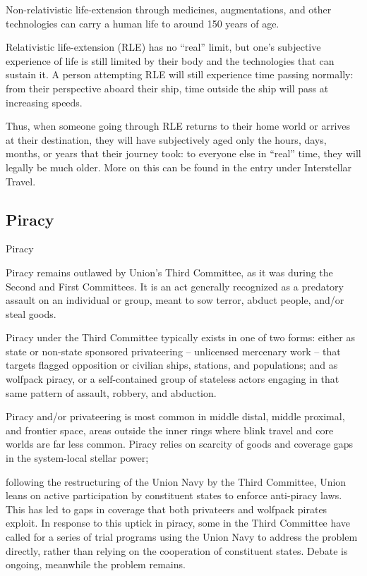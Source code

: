 Non-relativistic life-extension through medicines, augmentations, and other technologies can  
carry a human life to around 150 years of age.
 

Relativistic life-extension (RLE) has no “real” limit, but one’s subjective experience of life is still  
limited by their body and the technologies that can sustain it. A person attempting RLE will still  
experience time passing normally: from their perspective aboard their ship, time outside the ship  
will pass at increasing speeds. 
 

                                                                                                              


Thus, when someone going through RLE returns to their home world or arrives at their  
destination, they will have subjectively aged only the hours, days, months, or years that their  
journey took: to everyone else in “real” time, they will legally be much older. More on this can be  
found in the entry under Interstellar Travel. 
 
\subsection{Piracy}
Piracy   

Piracy remains outlawed by Union’s Third Committee, as it was during the Second and First  
Committees. It is an act generally recognized as a predatory assault on an individual or group,  
meant to sow terror, abduct people, and/or steal goods. 
 

Piracy under the Third Committee typically exists in one of two forms: either as state or non-state  
sponsored privateering -- unlicensed mercenary work -- that targets flagged opposition or  
civilian ships, stations, and populations; and as wolfpack piracy, or a self-contained group of  
stateless actors engaging in that same pattern of assault, robbery, and abduction. 
 

Piracy and/or privateering is most common in middle distal, middle proximal, and frontier space,  
areas outside the inner rings where blink travel and core worlds are far less common. Piracy  
relies on scarcity of goods and coverage gaps in the system-local stellar power;
 
following the restructuring of the Union Navy by the Third Committee, Union leans on active  
participation by constituent states to enforce anti-piracy laws. This has led to gaps in coverage  
that both privateers and wolfpack pirates exploit. In response to this uptick in piracy, some in the  
Third Committee have called for a series of trial programs using the Union Navy to address the  
problem directly, rather than relying on the cooperation of constituent states. Debate is ongoing,  
meanwhile the problem remains. 
 

